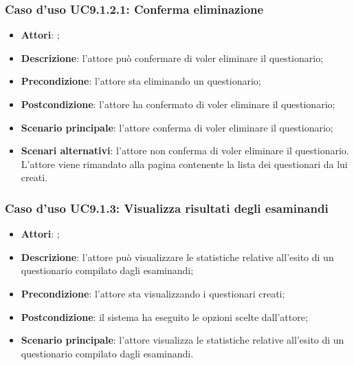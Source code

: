 				\subsubsection{Caso d'uso UC9.1.2.1: Conferma eliminazione}
				\label{UC9.1.2.1}
				\begin{itemize}
					\item \textbf{Attori}: \uaupro{};
					\item \textbf{Descrizione}: l'attore può confermare di voler eliminare il questionario; 
					\item \textbf{Precondizione}: l'attore sta eliminando un questionario;
					\item \textbf{Postcondizione}: l'attore ha confermato di voler eliminare il questionario;
					\item \textbf{Scenario principale}: l'attore conferma di voler eliminare il questionario;
					\item \textbf{Scenari alternativi}: l'attore non conferma di voler eliminare il questionario. L'attore viene rimandato alla pagina contenente la lista dei questionari da lui creati.
				\end{itemize}
								
		\subsubsection{Caso d'uso UC9.1.3: Visualizza risultati degli esaminandi}
		\label{UC9.1.3}
		\begin{itemize}
			\item \textbf{Attori}: \uaupro{};
			\item \textbf{Descrizione}: l'attore può visualizzare le statistiche relative all'esito di un  questionario compilato dagli esaminandi;
			\item \textbf{Precondizione}: l'attore sta visualizzando i questionari creati;
			\item \textbf{Postcondizione}: il sistema ha eseguito le opzioni scelte dall'attore;
			\item \textbf{Scenario principale}: l'attore visualizza le statistiche relative all'esito di un questionario compilato dagli esaminandi. 
		\end{itemize}
		
